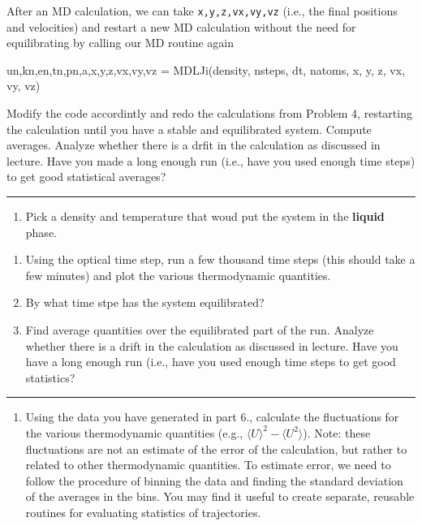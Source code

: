\documentclass[11pt]{article}
\providecommand{\tightlist}{%
      \setlength{\itemsep}{0pt}\setlength{\parskip}{0pt}}
\newenvironment{Shaded}{}{}
\newcommand{\NormalTok}[1]{{#1}}
\newcommand{\OperatorTok}[1]{\textcolor[rgb]{0.40,0.40,0.40}{{#1}}}
\begin{document}
After an MD calculation, we can take \texttt{x,y,z,vx,vy,vz} (i.e., the
final positions and velocities) and restart a new MD calculation without
the need for equilibrating by calling our MD routine again

\begin{Shaded}
\begin{Highlighting}[]
\NormalTok{un,kn,en,tn,pn,a,x,y,z,vx,vy,vz }\OperatorTok{=}\NormalTok{ MDLJi(density, nsteps, dt, natoms, x, y, z, vx, vy, vz)}
\end{Highlighting}
\end{Shaded}

Modify the code accordintly and redo the calculations from Problem 4,
restarting the calculation until you have a stable and equilibrated
system. Compute averages. Analyze whether there is a drfit in the
calculation as discussed in lecture. Have you made a long enough run
(i.e., have you used enough time steps) to get good statistical
averages?

\begin{center}\rule{0.5\linewidth}{0.5pt}\end{center}

    \begin{enumerate}
\def\labelenumi{\arabic{enumi}.}
\setcounter{enumi}{7}
\tightlist
\item
  Pick a density and temperature that woud put the system in the
  \textbf{liquid} phase.
\end{enumerate}

\begin{enumerate}
\def\labelenumi{\alph{enumi})}
\item
  Using the optical time step, run a few thousand time steps (this
  should take a few minutes) and plot the various thermodynamic
  quantities.
\item
  By what time stpe has the system equilibrated?
\item
  Find average quantities over the equilibrated part of the run. Analyze
  whether there is a drift in the calculation as discussed in lecture.
  Have you have a long enough run (i.e., have you used enough time steps
  to get good statistics?
\end{enumerate}

\begin{center}\rule{0.5\linewidth}{0.5pt}\end{center}

    \begin{enumerate}
\def\labelenumi{\arabic{enumi}.}
\setcounter{enumi}{8}
\tightlist
\item
  Using the data you have generated in part 6., calculate the
  fluctuations for the various thermodynamic quantities (e.g.,
  \(\langle U \rangle^2 - \langle U^2 \rangle\)). Note: these
  fluctuations are not an estimate of the error of the calculation, but
  rather to related to other thermodynamic quantities. To estimate
  error, we need to follow the procedure of binning the data and finding
  the standard deviation of the averages in the bins. You may find it
  useful to create separate, reusable routines for evaluating statistics
  of trajectories.
\end{enumerate}
\end{document}
